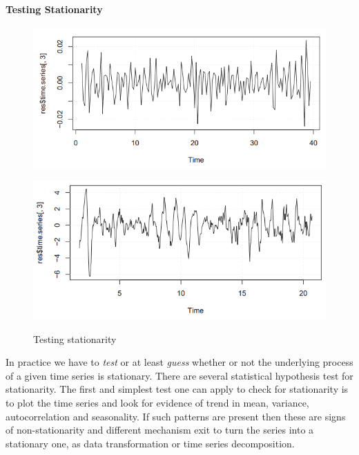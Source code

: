 {\paragraph{Testing Stationarity}
\begin{figure}[H]\centering
	\begin{minipage}[c]{0.5\textwidth}
		\includegraphics[width=1\linewidth]{images/tsAusElRemainder.png}
		\label{Fig:tsAusElRem}
	\end{minipage}\hfill
	\begin{minipage}[c]{0.5\textwidth}
		\includegraphics[width=1\linewidth]{images/tsAirTempRemainder.png}
		\label{Fig:tsAirTempRem}
	\end{minipage}
\caption{Testing stationarity}
\end{figure}
\RTheory
{
In practice we have to \textit{test} or at least \textit{guess} whether or not the underlying process of a given time series is stationary.
There are several statistical hypothesis test for stationarity. 
\vfill
\hfill
\break
The first and simplest test one can apply to check for stationarity is to plot the time series and look for evidence of trend in mean, variance, autocorrelation and seasonality. If such patterns are present then these are signs of non-stationarity and different mechanism exit to turn the series into a stationary one, as data transformation or time series decomposition.
}}
